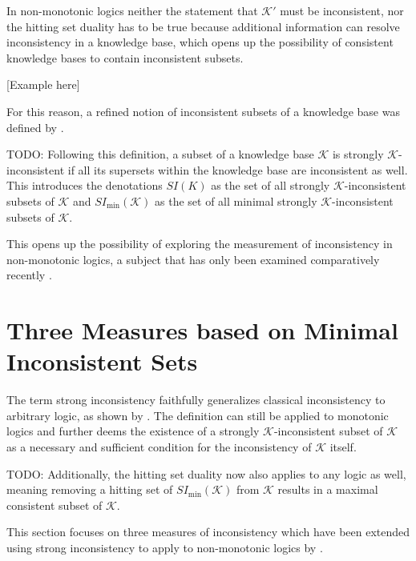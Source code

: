 In non-monotonic logics neither the statement that \(\mathcal{K}'\) must be inconsistent, nor the hitting set duality has to be true because additional information can resolve inconsistency in a knowledge base, which opens up the possibility of consistent knowledge bases to contain inconsistent subsets.

    [Example here]

For this reason, a refined notion of inconsistent subsets of a knowledge base was defined by \cite{brewka_strong_2017}.
\begin{definition}
    TODO:
    Following this definition, a subset of a knowledge base \(\mathcal{K}\) is strongly \(\mathcal{K}\)-inconsistent if all its supersets within the knowledge base are inconsistent as well. This introduces the denotations \(SI(K)\) as the set of all strongly \(\mathcal{K}\)-inconsistent subsets of \(\mathcal{K}\) and \(SI_{\min}(\mathcal{K})\) as the set of all minimal strongly \(\mathcal{K}\)-inconsistent subsets of \(\mathcal{K}\).
\end{definition}

This opens up the possibility of exploring the measurement of inconsistency in non-monotonic logics, a subject that has only been examined comparatively recently \cite{ulbricht_measuring_2018} \cite{brewka_strong_2019} \cite{ulbricht_handling_2020}.

\section{Three Measures based on Minimal Inconsistent Sets}
The term strong inconsistency faithfully generalizes classical inconsistency to arbitrary logic, as shown by \cite{brewka_strong_2017}. The definition can still be applied to monotonic logics and further deems the existence of a strongly \(\mathcal{K}\)-inconsistent subset of \(\mathcal{K}\) as a necessary and sufficient condition for the inconsistency of \(\mathcal{K}\) itself.

\begin{theorem}
    TODO:
    Additionally, the hitting set duality now also applies to any logic as well, meaning removing a hitting set of \(SI_{\min}(\mathcal{K})\) from \(\mathcal{K}\) results in a maximal consistent subset of \(\mathcal{K}\).
\end{theorem}

This section focuses on three measures of inconsistency which have been extended using strong inconsistency to apply to non-monotonic logics by \cite{ulbricht_handling_2020}.

